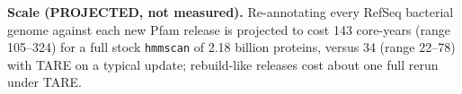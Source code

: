 \documentclass[letterpaper,twocolumn,10pt]{article}
\theoremstyle{definition}
\newcommand{\sys}{TARE\xspace}
\newcommand{\sys}{PARE\xspace}
\providecommand{\DIFaddend}{} %
\DeclareRobustCommand{\DIFaddend}{\DIFOaddend \let\includegraphics\DIFOincludegraphics} %
\begin{document}
{%
}\DIFaddend 

\textbf{Scale (PROJECTED, not measured).} Re-annotating every RefSeq bacterial genome against each new Pfam release is projected to cost
143 core\nobreakdash-years (range 105--324) for a full stock \texttt{hmmscan} of 2.18 billion proteins, versus 34
(range 22--78) with \sys on a typical update; rebuild-like releases cost about one full rerun under \sys.
\end{document}
